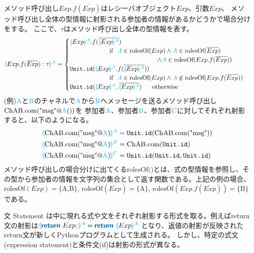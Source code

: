 \documentclass{thesis}
\newcommand{\projection}[2]{{\color{cyan}\llparenthesis}#1{\color{cyan}\rrparenthesis^#2}}
\newcommand{\mblue}[1]{\textbf{\textsf{\color{MidnightBlue}#1}}}
\newcommand{\cyan}[1]{\color{cyan}#1}
\begin{document}
メソッド呼び出し$Exp.f(\overline{Exp})$はレシーバオブジェクト$Exp$、引数$\overline{Exp}$、
メソッド呼び出し全体の型情報に射影される参加者の情報があるかどうかで場合分けをする。
ここで、$\tau$はメソッド呼び出し全体の型情報を表す。
\begin{alignat*}{2} 
  &\projection{Exp.f(\overline{Exp}):\tau}{A}=
  \begin{cases}
    \projection{Exp}{A}.f(\overline{\projection{Exp}{A}}) \\
    ~~~~~~~~~~~~~~~~~~~\text{if}~~ {\color{cyan}A} \in \text{rolesOf}(Exp) \wedge {\color{cyan}A} \in \text{rolesOf}(\overline{Exp})\\
    ~~~~~~~~~~~~~~~~~~~~~~~~~~~~~~~~~~~~~~~~~~ \wedge {\color{cyan}A} \in \text{rolesOf}(Exp.f(\overline{Exp}))\\
    \texttt{Unit.id}(\projection{Exp}{A}.f(\overline{\projection{Exp}{A}})) \\
    ~~~~~~~~~~~~~~~~~~~\text{if}~~ {\color{cyan}A} \in \text{rolesOf}(Exp) \wedge {\color{cyan}A} \notin \text{rolesOf}(Exp.f(\overline{Exp}))\\
    \texttt{Unit.id}(\projection{Exp}{A},\overline{\projection{Exp}{A}}) ~~~~~\text{otherwise}
  \end{cases}\\
\end{alignat*}
(例)$\cyan{\text{A}}$と$\cyan{\text{B}}$のチャネルで$\cyan{\text{A}}$から$\cyan{\text{B}}$へメッセージを送るメソッド呼び出し$\text{ChAB.com("msg"@{\cyan{A}}())}$を
参加者$\cyan{\text{A}}$、参加者$\cyan{\text{B}}$、参加者$\cyan{\text{C}}$に対してそれぞれ射影すると、以下のようになる。
\begin{alignat*}{2} 
  &\projection{\text{ChAB.com("msg"@{\cyan{A}})}}{A} = \texttt{Unit.id}(\text{ChAB.com("msg")})\\
  &\projection{\text{ChAB.com("msg"@{\cyan{A}})}}{B} = \text{ChAB.com(\texttt{Unit.id})}\\
  &\projection{\text{ChAB.com("msg"@{\cyan{A}})}}{C} = \texttt{Unit.id}(\texttt{Unit.id},\texttt{Unit.id})
\end{alignat*}
メソッド呼び出しの場合分けに出てくる$\text{rolesOf()}$とは、式の型情報を参照し、その型から参加者の情報を文字列の集合として返す関数である。上記の例の場合、$\text{rolesOf}(Exp) = \{\text{A,B}\}$, 
$\text{rolesOf}(\overline{Exp}) = \{\text{A}\}$, $\text{rolesOf}(Exp.f(\overline{Exp})) = \{\text{B}\}$である。

文 Statement は中に現れる式や文をそれぞれ射影する形式を取る。例えばreturn文の射影は$\projection{\mblue{return} ~ Exp;}{A} = \mblue{return} ~ \projection{Exp}{A}$
となり、返値の射影が反映されたreturn文が新しくPythonプログラムとして生成される。
しかし、特定の式文(expression statement)と条件文(if)は射影の形式が異なる。
\end{document}
